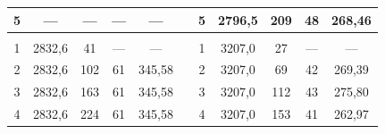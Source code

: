 \documentclass[11pt,a4paper,oneside]{article}
\begin{document}
\begin{enumerate}
\begin{center}
\begin{table}[h!]
\begin{tabular}{ccccccccccc}
\multicolumn{1}{|c|}{5}          & \multicolumn{1}{c|}{---}            & \multicolumn{1}{c|}{---}            & \multicolumn{1}{c|}{---}                     & \multicolumn{1}{c|}{---}             & \multicolumn{1}{c|}{}          & \multicolumn{1}{c|}{5}          & \multicolumn{1}{c|}{2796,5}         & \multicolumn{1}{c|}{209}            & \multicolumn{1}{c|}{48}                     & \multicolumn{1}{c|}{268,46}          \\ \hline
\multicolumn{1}{|c|}{}           & \multicolumn{1}{c|}{}               & \multicolumn{1}{c|}{}               & \multicolumn{1}{c|}{}                        & \multicolumn{1}{c|}{}                & \multicolumn{1}{c|}{}          & \multicolumn{1}{c|}{}           & \multicolumn{1}{c|}{}               & \multicolumn{1}{c|}{}               & \multicolumn{1}{c|}{}                       & \multicolumn{1}{c|}{}                \\ \hline
\multicolumn{1}{|c|}{1}          & \multicolumn{1}{c|}{2832,6}         & \multicolumn{1}{c|}{41}             & \multicolumn{1}{c|}{---}                     & \multicolumn{1}{c|}{---}             & \multicolumn{1}{c|}{}          & \multicolumn{1}{c|}{1}          & \multicolumn{1}{c|}{3207,0}         & \multicolumn{1}{c|}{27}             & \multicolumn{1}{c|}{---}                    & \multicolumn{1}{c|}{---}             \\ \hline
\multicolumn{1}{|c|}{2}          & \multicolumn{1}{c|}{2832,6}         & \multicolumn{1}{c|}{102}            & \multicolumn{1}{c|}{61}                      & \multicolumn{1}{c|}{345,58}          & \multicolumn{1}{c|}{}          & \multicolumn{1}{c|}{2}          & \multicolumn{1}{c|}{3207,0}         & \multicolumn{1}{c|}{69}             & \multicolumn{1}{c|}{42}                     & \multicolumn{1}{c|}{269,39}          \\ \hline
\multicolumn{1}{|c|}{3}          & \multicolumn{1}{c|}{2832,6}         & \multicolumn{1}{c|}{163}            & \multicolumn{1}{c|}{61}                      & \multicolumn{1}{c|}{345,58}          & \multicolumn{1}{c|}{}          & \multicolumn{1}{c|}{3}          & \multicolumn{1}{c|}{3207,0}         & \multicolumn{1}{c|}{112}            & \multicolumn{1}{c|}{43}                     & \multicolumn{1}{c|}{275,80}          \\ \hline
\multicolumn{1}{|c|}{4}          & \multicolumn{1}{c|}{2832,6}         & \multicolumn{1}{c|}{224}            & \multicolumn{1}{c|}{61}                      & \multicolumn{1}{c|}{345,58}          & \multicolumn{1}{c|}{}          & \multicolumn{1}{c|}{4}          & \multicolumn{1}{c|}{3207,0}         & \multicolumn{1}{c|}{153}            & \multicolumn{1}{c|}{41}                     & \multicolumn{1}{c|}{262,97}          \\ \hline

\end{tabular}
\end{table}
\end{center}
\end{enumerate}
\end{document}
